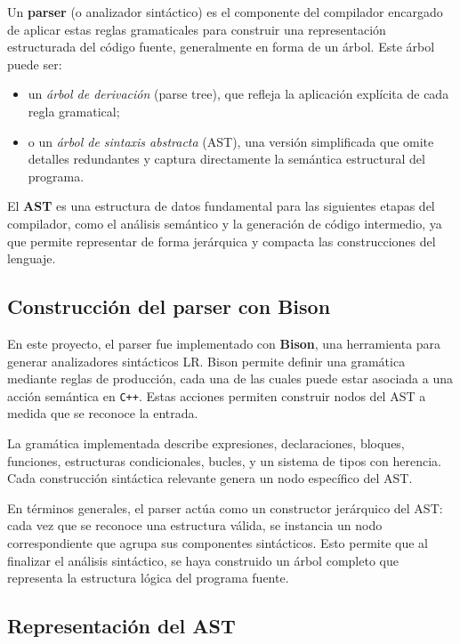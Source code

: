 \documentclass{llncs}
\begin{document}
	Un \textbf{parser} (o analizador sintáctico) es el componente del compilador encargado de aplicar estas reglas gramaticales para construir una representación estructurada del código fuente, generalmente en forma de un árbol. Este árbol puede ser:

	\begin{itemize}
		\item un \textit{árbol de derivación} (parse tree), que refleja la aplicación explícita de cada regla gramatical;
		\item o un \textit{árbol de sintaxis abstracta} (AST), una versión simplificada que omite detalles redundantes y captura directamente la semántica estructural del programa.
	\end{itemize}

	El \textbf{AST} es una estructura de datos fundamental para las siguientes etapas del compilador, como el análisis semántico y la generación de código intermedio, ya que permite representar de forma jerárquica y compacta las construcciones del lenguaje.

	\subsection{Construcción del parser con Bison}

	En este proyecto, el parser fue implementado con \textbf{Bison}, una herramienta para generar analizadores sintácticos LR. Bison permite definir una gramática mediante reglas de producción, cada una de las cuales puede estar asociada a una acción semántica en \texttt{C++}. Estas acciones permiten construir nodos del AST a medida que se reconoce la entrada.

	La gramática implementada describe expresiones, declaraciones, bloques, funciones, estructuras condicionales, bucles, y un sistema de tipos con herencia. Cada construcción sintáctica relevante genera un nodo específico del AST. 

	En términos generales, el parser actúa como un constructor jerárquico del AST: cada vez que se reconoce una estructura válida, se instancia un nodo correspondiente que agrupa sus componentes sintácticos. Esto permite que al finalizar el análisis sintáctico, se haya construido un árbol completo que representa la estructura lógica del programa fuente.

	\subsection{Representación del AST}
\end{document}
